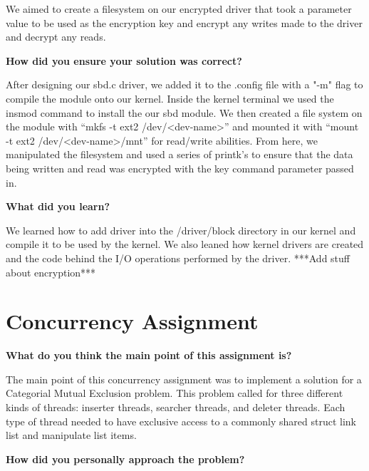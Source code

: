 \documentclass[10pt,letterpaper,draftclsnofoot,onecolumn]{IEEEtran}
\begin{document}
\medskip

\noindent We aimed to create a filesystem on our encrypted driver that took a parameter value to be used as the encryption key and encrypt any writes made to the driver and decrypt any reads. 

\bigskip

\noindent\textbf{How did you ensure your solution was correct?}
\medskip

\medskip

\noindent After designing our sbd.c driver, we added it to the .config file with a "-m" flag to compile the module onto our kernel. Inside the kernel terminal we used the insmod command to install the our sbd module. We then created a file system on the module with ``mkfs -t ext2 /dev/\textless dev-name\textgreater'' and mounted it with ``mount -t ext2 /dev/\textless dev-name\textgreater /mnt'' for read/write abilities. From here, we manipulated the filesystem and used a series of printk's to ensure that the data being written and read was encrypted with the key command parameter passed in.

\bigskip

\noindent\textbf{What did you learn?}
\medskip

\medskip

\noindent We learned how to add driver into the /driver/block directory in our kernel and compile it to be used by the kernel. We also leaned how kernel drivers are created and the code behind the I/O operations performed by the driver. 
***Add stuff about encryption***
\section{Concurrency Assignment}
\bigskip

\noindent\textbf{What do you think the main point of this assignment is?}
\medskip

\medskip

\noindent The main point of this concurrency assignment was to implement a solution for a Categorial Mutual Exclusion problem. This problem called for three different kinds of threads: inserter threads, searcher threads, and deleter threads. Each type of thread needed to have exclusive access to a commonly shared struct link list and manipulate list items.

\bigskip

\noindent\textbf{How did you personally approach the problem?}
\medskip

\medskip
\end{document}

